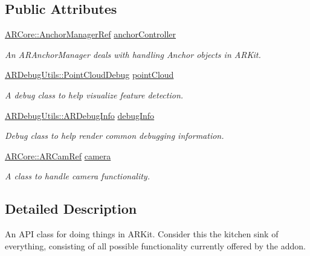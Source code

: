 \subsection*{Public Attributes}
\begin{DoxyCompactItemize}
\item 
\hyperlink{namespace_a_r_core_a3f2b9ba00b51ce19c1010f554a66a512}{A\+R\+Core\+::\+Anchor\+Manager\+Ref} \hyperlink{class_a_r_processor_a8a1a8f16b30d2b0b4839a30d7ba4763d}{anchor\+Controller}
\begin{DoxyCompactList}\small\item\em An A\+R\+Anchor\+Manager deals with handling Anchor objects in A\+R\+Kit. \end{DoxyCompactList}\item 
\hyperlink{class_a_r_debug_utils_1_1_point_cloud_debug}{A\+R\+Debug\+Utils\+::\+Point\+Cloud\+Debug} \hyperlink{class_a_r_processor_a555e829fbf6b625537f6fd7cd9557002}{point\+Cloud}
\begin{DoxyCompactList}\small\item\em A debug class to help visualize feature detection. \end{DoxyCompactList}\item 
\hyperlink{class_a_r_debug_utils_1_1_a_r_debug_info}{A\+R\+Debug\+Utils\+::\+A\+R\+Debug\+Info} \hyperlink{class_a_r_processor_a6b7b4d5ac724bd93a7828759f7f6da4e}{debug\+Info}
\begin{DoxyCompactList}\small\item\em Debug class to help render common debugging information. \end{DoxyCompactList}\item 
\hyperlink{namespace_a_r_core_a4ebe9e23907235fcf76bf65440fde0e0}{A\+R\+Core\+::\+A\+R\+Cam\+Ref} \hyperlink{class_a_r_processor_a0df4995c56cb187db281726d7631d9ed}{camera}
\begin{DoxyCompactList}\small\item\em A class to handle camera functionality. \end{DoxyCompactList}\end{DoxyCompactItemize}


\subsection{Detailed Description}
An A\+PI class for doing things in A\+R\+Kit. Consider this the kitchen sink of everything, consisting of all possible functionality currently offered by the addon. 

